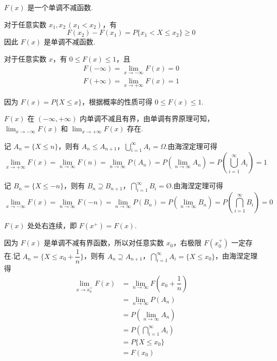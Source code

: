 \begin{property}[（单调性）]
    $F(x)$ 是一个单调不减函数.
\end{property}

\begin{myproof}
    对于任意实数 $x_1,x_2\, (x_1<x_2)$，有
    $$
    F(x_2)-F(x_1) = P\{x_1 < X \leqslant x_2\} \geqslant 0
    $$
    因此 $F(x)$ 是单调不减函数.
\end{myproof}

\begin{property}[（有界性）]
    对于任意实数 $x$，有 $0 \leqslant F(x) \leqslant 1$，且
    \begin{gather*}
        F(-\infty)= \lim_{x \to -\infty} F(x)=0\\
        F(+\infty)= \lim_{x \to +\infty} F(x)=1
    \end{gather*}
\end{property}

\begin{myproof}
    因为 $F(x) = P \{ X \leqslant x \}$，根据概率的性质可得 $0 \leqslant F(x) \leqslant 1$.

    $F(x)$ 在 $(-\infty, +\infty)$ 内单调不减且有界，由单调有界原理可知，$\displaystyle\lim_{x \to -\infty} F(x)$ 和 $\displaystyle\lim_{x \to +\infty} F(x)$ 存在.

    记 $A_n = \{ X \leqslant n \}$，则有 $A_n \leqslant A_{n+1}$，$\displaystyle\bigcup_{i=1}^{\infty} A_i = \varOmega$.由海涅定理可得
    $$
    \lim_{x \to +\infty} F(x) = \lim_{n \to \infty} F(n) = \lim_{n \to \infty} P(A_n) = P(\lim_{n \to \infty} A_n) = P(\bigcup_{i=1}^{\infty} A_i) = 1
    $$

    记 $B_n = \{ X \leqslant -n \}$，则有 $B_n \supseteq B_{n+1}$，$\displaystyle\bigcap_{i=1}^{\infty} B_i = \text{\O}$.由海涅定理可得
    $$
    \lim_{x \to -\infty} F(x) = \lim_{n \to \infty} F(-n) = \lim_{n \to \infty} P(B_n) = P(\lim_{n \to \infty} B_n) = P(\bigcap_{i=1}^{\infty} B_i) = 0
    $$
\end{myproof}

\begin{property}[（右连续性）]
    $F(x)$ 处处右连续，即 $F(x^+)=F(x)$.
\end{property}

\begin{myproof}
    因为 $F(x)$ 是单调不减有界函数，所以对任意实数 $x_0$，右极限 $F(x_0^+)$ 一定存在.记 $A_n = \{ X \leqslant x_0 + \dfrac{1}{n} \}$，则有 $A_n \supseteq A_{n+1}$，$\displaystyle\bigcap_{i=1}^{\infty} A_i = \{ X \leqslant x_0 \}$，由海涅定理得
    $$
    \begin{aligned}
        \lim_{x \to x_0^+} F(x) &= \lim_{n \to \infty} F(x_0 + \dfrac{1}{n}) \\
        &= \lim_{n \to \infty} P(A_n) \\
        &= P(\lim_{n \to \infty} A_n) \\
        &= P(\bigcap_{i=1}^{\infty} A_i) \\
        &= P \{ X \leqslant x_0 \} \\
        &= F(x_0)
    \end{aligned}
    $$
\end{myproof}

